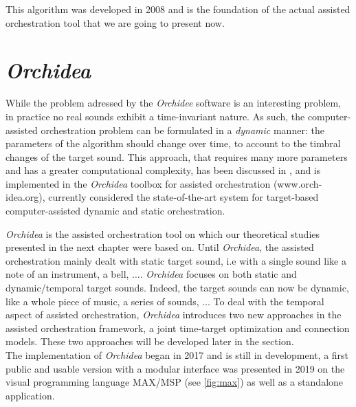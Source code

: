 \documentclass[a4paper]{book}
\begin{document}
This algorithm was developed in 2008 and is the foundation of the actual assisted orchestration tool that we are going to present now.

\section{\textit{Orchidea}}

While the problem adressed by the \textit{Orchidee} software is an interesting problem, in practice no real sounds exhibit a time-invariant nature. As such, the computer-assisted orchestration problem can be formulated in a \emph{dynamic} manner: the parameters of the algorithm should change over time, to account to the timbral changes of the target sound.
This approach, that requires many more parameters and has a greater computational complexity, has been discussed in \cite{Cella2018},
\cite{Cella2020b} and is implemented in the \textit{Orchidea} toolbox for assisted orchestration ({www.orch-idea.org}), currently considered the state-of-the-art system for target-based computer-assisted dynamic and static orchestration.


\textit{Orchidea} is the assisted orchestration tool on which our theoretical studies presented in the next chapter were based on. Until \textit{Orchidea}, the assisted orchestration mainly dealt with static target sound, i.e with a single sound like a note of an instrument, a bell, $\ldots$. \textit{Orchidea} focuses on both static and dynamic/temporal target sounds. Indeed, the target sounds can now be dynamic, like a whole piece of music, a series of sounds, $\ldots$ To deal with the temporal aspect of assisted orchestration, \textit{Orchidea} introduces two new approaches in the assisted orchestration framework, a joint time-target optimization and connection models. These two approaches will be developed later in the section. \\
The implementation of \textit{Orchidea} began in 2017 and is still in development, a first public and usable version with a modular interface was presented in 2019 on the visual programming language MAX/MSP (see \ref{fig:max}) as well as a standalone application. \\
\end{document}
